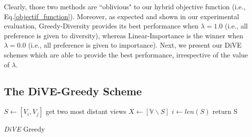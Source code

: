 Clearly, those two methods are ``oblivious" to our hybrid objective function (i.e., Eq.\ref{objectif_function}). 
%
%
Moreover, as expected and shown in our experimental evaluation, Greedy-Diversity provides its best performance when $\lambda=1.0$ (i.e., all preference is given to diversity), whereas Linear-Importance is the winner when $\lambda=0.0$ (i.e., all preference is given to importance). 
%
Next, we present our DiVE schemes which are able to provide the best performance, irrespective of the value of $\lambda$.



\subsection{The DiVE-Greedy Scheme}\label{subsec:dive-greedy}

\setlength{\textfloatsep}{0pt}%
\begin{algorithm}[t]
	\SetAlgoLined
	$S \leftarrow \left[V_i, V_j\right] $ get  two most distant views\;
	$X \leftarrow  \left[\mathbb{V} \backslash S\right]$\;
	$i \leftarrow len\left(S\right) $\;
	return S
	\caption{\textit{DiVE} Greedy}
	\label{DiVE-Greedy}
\end{algorithm}

